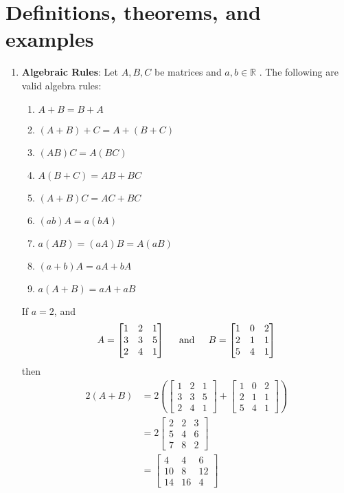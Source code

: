 
\section*{Definitions, theorems, and examples}
\begin{enumerate}
\item  \textbf{Algebraic Rules}:  Let $A, B, C$ be matrices and $a, b \in \mathbb{R}$ .  The following are valid algebra rules:
\begin{enumerate}
	\item $A+B = B+A$
	\item $(A+B)+C = A+(B+C)$
	\item $(AB)C = A(BC)$
	\item $A(B+C) = AB + BC$
	
	\item $(A+B)C = AC + BC$
	\item $(ab)A = a(bA)$
	\item $ a (AB) = (aA)B = A(aB)$
	\item $(a+b)A = aA+bA$
	\item $a(A+B) = aA +aB$
\end{enumerate}




\begin{example} If $a = 2$, and 
$$ A = \begin{bmatrix}  1& 2& 1\\ 3 & 3 & 5 \\ 2  &  4  &  1 \end{bmatrix} \text{\;\;\;\; and \;\;\;\;} B = \begin{bmatrix}  1& 0& 2\\ 2 & 1 &  1 \\ 5  &  4  &  1 \end{bmatrix}$$ 
then
 \begin{align*}
  2(A+B)  &= 2 \left( \begin{bmatrix}  1& 2& 1\\ 3 & 3 & 5 \\ 2  &  4  &  1 \end{bmatrix}+  \begin{bmatrix}  1& 0& 2\\ 2 & 1 &  1 \\ 5  &  4  &  1 \end{bmatrix} \right) \\
  &= 2 \begin{bmatrix} 2 & 2  &3 \\ 5 & 4 & 6 \\ 7  &  8  &  2  \end{bmatrix}\\
  &= \begin{bmatrix} 4 & 4  &6 \\ 10 & 8 & 12 \\ 14  &  16  &  4  \end{bmatrix}
 \end{align*}
 

\end{example}
\end{enumerate}
